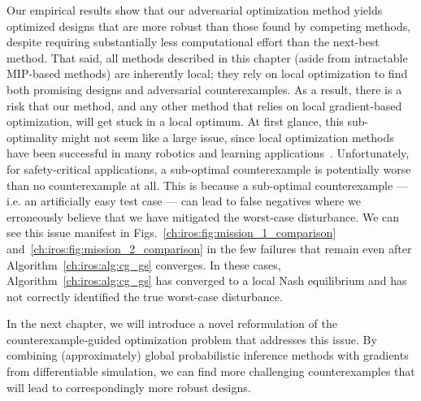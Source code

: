 Our empirical results show that our adversarial optimization method yields optimized designs that are more robust than those found by competing methods, despite requiring substantially less computational effort than the next-best method. That said, all methods described in this chapter (aside from intractable MIP-based methods) are inherently local; they rely on local optimization to find both promising designs and adversarial counterexamples. As a result, there is a risk that our method, and any other method that relies on local gradient-based optimization, will get stuck in a local optimum. At first glance, this sub-optimality might not seem like a large issue, since local optimization methods have been successful in many robotics and learning applications~\cite{dawsonCertifiableRobotDesign2022}. Unfortunately, for safety-critical applications, a sub-optimal counterexample is potentially worse than no counterexample at all. This is because a sub-optimal counterexample --- i.e. an artificially easy test case --- can lead to false negatives where we erroneously believe that we have mitigated the worst-case disturbance. We can see this issue manifest in Figs.~\ref{ch:iros:fig:mission_1_comparison} and~\ref{ch:iros:fig:mission_2_comparison} in the few failures that remain even after Algorithm~\ref{ch:iros:alg:cg_gs} converges. In these cases, Algorithm~\ref{ch:iros:alg:cg_gs} has converged to a local Nash equilibrium and has not correctly identified the true worst-case disturbance.

In the next chapter, we will introduce a novel reformulation of the counterexample-guided optimization problem that addresses this issue. By combining (approximately) global probabilistic inference methods with gradients from differentiable simulation, we can find more challenging counterexamples that will lead to correspondingly more robust designs.